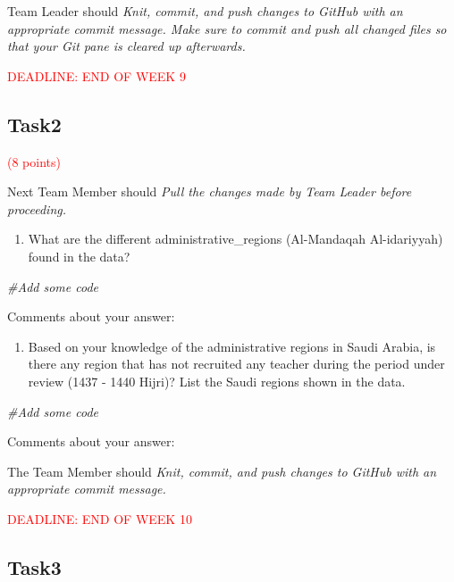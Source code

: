 \documentclass[
]{article}
\newenvironment{Shaded}{\begin{snugshade}}{\end{snugshade}}
\newcommand{\CommentTok}[1]{\textcolor[rgb]{0.56,0.35,0.01}{\textit{#1}}}
\providecommand{\tightlist}{%
  \setlength{\itemsep}{0pt}\setlength{\parskip}{0pt}}
\begin{document}
Team Leader should \emph{Knit, commit, and push changes to GitHub with
an appropriate commit message. Make sure to commit and push all changed
files so that your Git pane is cleared up afterwards.}

\textcolor{red}{DEADLINE: END OF WEEK 9}

\hypertarget{task2}{%
\subsection{Task2}\label{task2}}

\textcolor{red}{(8 points)}

Next Team Member should \emph{Pull the changes made by Team Leader
before proceeding.}

\begin{enumerate}
\def\labelenumi{(\alph{enumi})}
\tightlist
\item
  What are the different administrative\_regions (Al-Mandaqah
  Al-idariyyah) found in the data?
\end{enumerate}

\begin{Shaded}
\begin{Highlighting}[]
\CommentTok{\#Add some code}
\end{Highlighting}
\end{Shaded}

Comments about your answer:

\begin{enumerate}
\def\labelenumi{(\alph{enumi})}
\setcounter{enumi}{1}
\tightlist
\item
  Based on your knowledge of the administrative regions in Saudi Arabia,
  is there any region that has not recruited any teacher during the
  period under review (1437 - 1440 Hijri)? List the Saudi regions shown
  in the data.
\end{enumerate}

\begin{Shaded}
\begin{Highlighting}[]
\CommentTok{\#Add some code}
\end{Highlighting}
\end{Shaded}

Comments about your answer:

The Team Member should \emph{Knit, commit, and push changes to GitHub
with an appropriate commit message.}

\textcolor{red}{DEADLINE: END OF WEEK 10}

\hypertarget{task3}{%
\subsection{Task3}\label{task3}}
\end{document}
